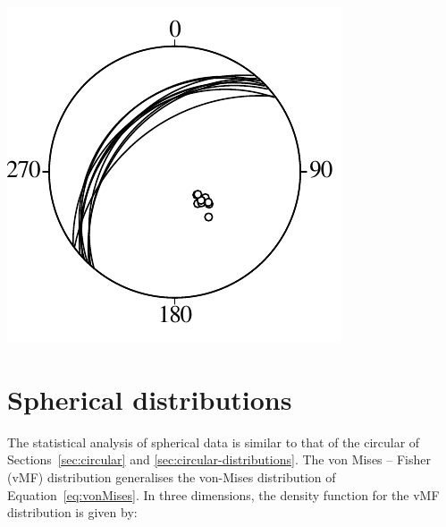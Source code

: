 \begin{enumerate}
\noindent\begin{minipage}[t][][b]{.3\indentwidth}
\includegraphics[width=\textwidth]{../figures/fault.pdf}\\
\end{minipage}
\begin{minipage}[t][][t]{.7\indentwidth}
  \label{fig:fault}
\end{minipage}

\end{enumerate}

\section{Spherical distributions}
\label{sec:spherical-distributions}

The statistical analysis of spherical data is similar to that of the
circular of Sections~\ref{sec:circular} and
\ref{sec:circular-distributions}. The von Mises -- Fisher (vMF)
distribution generalises the von-Mises distribution of
Equation~\ref{eq:vonMises}.  In three dimensions, the density function
for the vMF distribution is given by:

